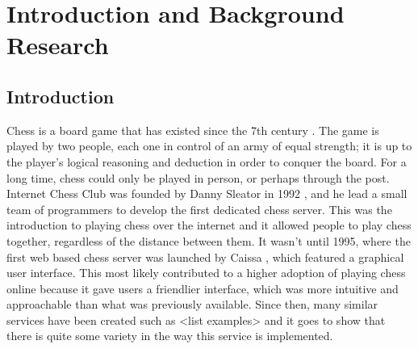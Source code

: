 \chapter{Introduction and Background Research}

\label{chapter1}

\section{Introduction}

Chess is a board game that has existed since the 7th century \cite{AHistoryOfChess}. The game is played by two people, each one in control of an army of equal strength; it is up to the player's logical reasoning and deduction in order to conquer the board. For a long time, chess could only be played in person, or perhaps through the post. Internet Chess Club was founded by Danny Sleator in 1992 \cite{InternetChessClub}, and he lead a small team of programmers to develop the first dedicated chess server. This was the introduction to playing chess over the internet and it allowed people to play chess together, regardless of the distance between them. It wasn't until 1995, where the first web based chess server was launched by Caissa \cite{Caissa}, which featured a graphical user interface. This most likely contributed to a higher adoption of playing chess online because it gave users a friendlier interface, which was more intuitive and approachable than what was previously available. Since then, many similar services have been created such as <list examples> and it goes to show that there is quite some variety in the way this service is implemented.


